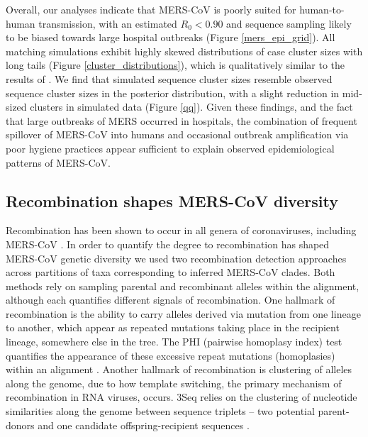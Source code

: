 \documentclass[9pt,lineno]{elife}
\begin{document}
Overall, our analyses indicate that MERS-CoV is poorly suited for human-to-human transmission, with an estimated $R_{0}<0.90$ and sequence sampling likely to be biased towards large hospital outbreaks (Figure \ref{mers_epi_grid}).
All matching simulations exhibit highly skewed distributions of case cluster sizes with long tails (Figure \ref{cluster_distributions}), which is qualitatively similar to the results of \citep{cauchemez_unraveling_2016}.
We find that simulated sequence cluster sizes resemble observed sequence cluster sizes in the posterior distribution, with a slight reduction in mid-sized clusters in simulated data (Figure \ref{qq}).
Given these findings, and the fact that large outbreaks of MERS occurred in hospitals, the combination of frequent spillover of MERS-CoV into humans and occasional outbreak amplification via poor hygiene practices \citep{assiri_hospital_2013,chen_comparative_2017} appear sufficient to explain observed epidemiological patterns of MERS-CoV.


\subsection*{Recombination shapes MERS-CoV diversity}
Recombination has been shown to occur in all genera of coronaviruses, including MERS-CoV \citep{lai_1985,makino_1986,keck_1988,kottier_1995,herrewegh_1998}.
In order to quantify the degree to recombination has shaped MERS-CoV genetic diversity we used two recombination detection approaches across partitions of taxa corresponding to inferred MERS-CoV clades.
Both methods rely on sampling parental and recombinant alleles within the alignment, although each quantifies different signals of recombination.
One hallmark of recombination is the ability to carry alleles derived via mutation from one lineage to another, which appear as repeated mutations taking place in the recipient lineage, somewhere else in the tree.
The PHI (pairwise homoplasy index) test quantifies the appearance of these excessive repeat mutations (homoplasies) within an alignment \citep{bruen_simple_2006}.
Another hallmark of recombination is clustering of alleles along the genome, due to how template switching, the primary mechanism of recombination in RNA viruses, occurs.
3Seq relies on the clustering of nucleotide similarities along the genome between sequence triplets -- two potential parent-donors and one candidate offspring-recipient sequences \citep{boni_exact_2007}.
\end{document}

